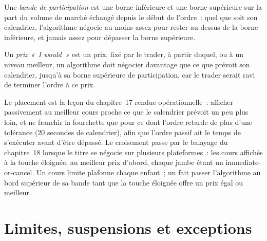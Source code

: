 \begin{definition}\label{def:mx:build-an-execution-algorithm:band}
Une \emph{bande de participation} est une borne inférieure et une borne supérieure sur la part du volume de marché échangé depuis le début
de l'ordre~: quel que soit son calendrier, l'algorithme négocie au moins assez pour rester au-dessus de la borne inférieure, et jamais assez pour dépasser
la borne supérieure.
\end{definition}

\begin{definition}\label{def:mx:build-an-execution-algorithm:iwould}
Un \emph{prix «~I would~»} est un prix, fixé par le trader, à partir duquel, ou à un niveau meilleur, un algorithme doit négocier davantage que ce que
prévoit son calendrier, jusqu'à sa borne supérieure de participation, car le trader serait ravi de terminer l'ordre à ce prix.
\end{definition}

Le placement est la leçon du chapitre~17 rendue opérationnelle~: afficher passivement au meilleur cours proche ce que le calendrier prévoit un peu plus loin, et ne franchir la fourchette que pour ce
dont l'ordre retarde de plus d'une tolérance (20 secondes de calendrier), afin que l'ordre passif ait le temps de s'exécuter avant d'être dépassé. Le croisement passe
par le balayage du chapitre~18 lorsque le titre se négocie sur plusieurs plateformes~: les cours affichés à la touche éloignée, au meilleur prix d'abord, chaque jambe étant un
 immediate-or-cancel. Un cours limite plafonne chaque enfant~; un  fait passer l'algorithme au bord supérieur de sa bande tant que la touche éloignée offre un prix égal ou
meilleur.

\label{lst:mx:build-an-execution-algorithm:check}

\section{Limites, suspensions et exceptions}

